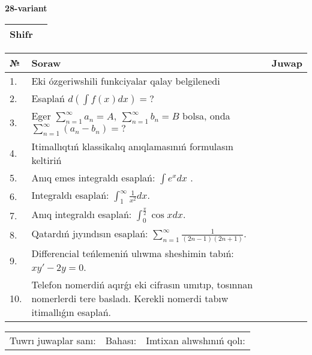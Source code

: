 \documentclass{article}
\begin{document}
  \egroup
  
  \newpage
  
  
  \textbf{28-variant}\\
  
  \bgroup
  \def\arraystretch{1.6} %
  
  \begin{tabular}{|m{5.7cm}|m{9.5cm}|}
  \hline
  Shifr & \\
  \hline
  \end{tabular}
  
  \vspace{1cm}
  
  \begin{tabular}{|m{0.7cm}|m{10cm}|m{4cm}|}
  \hline
  № & Soraw & Juwap \\
  \hline
  1. & Eki ózgeriwshili funkciyalar qalay belgilenedi &  \\
  \hline
  2. & Esaplań \(d\left( \int{f(x)dx} \right) = ?\) &  \\
  \hline
  3. & Eger \(\sum_{n = 1}^{\infty}a_{n} = A,\ \sum_{n = 1}^{\infty}b_{n} = B\) bolsa, onda \(\sum_{n = 1}^{\infty}\left( a_{n} - b_{n} \right) = ?\) &  \\
  \hline
  4. & Itimallıqtıń klassikalıq anıqlamasınıń formulasın keltiriń &  \\
  \hline
  5. & Anıq emes integraldı esaplań: \(\int{e^{x}dx}\) . &  \\
  \hline
  6. & Integraldı esaplań: \(\int_{1}^{\infty}{\frac{1}{x^2 }dx}\). &  \\
  \hline
  7. & Anıq integraldı esaplań: \(\int_{0}^{\frac{\pi}{2}}{\cos xdx}\). &  \\
  \hline
  8. & Qatardıń jıyındısın esaplań: \(\sum_{n = 1}^{\infty}\frac{1}{(2n - 1)(2n + 1)}\). &  \\
  \hline
  9. & Differencial teńlemeniń ulıwma sheshimin tabıń: \(xy' - 2y = 0\). &  \\
  \hline
  10. & Telefon nomerdiń aqırǵı eki cifrasın umıtıp, tosınnan nomerlerdi tere basladı. Kerekli nomerdi tabıw itimallıǵın esaplań. &  \\
  \hline
  \end{tabular}
  
  \vspace{1cm}
  
  \begin{tabular}{lll}
  Tuwrı juwaplar sanı: \underline{\hspace{1.5cm}} & 
  Bahası: \underline{\hspace{1.5cm}} & 
  Imtixan alıwshınıń qolı: \underline{\hspace{2cm}} \\
  \end{tabular}
  
\end{document}
